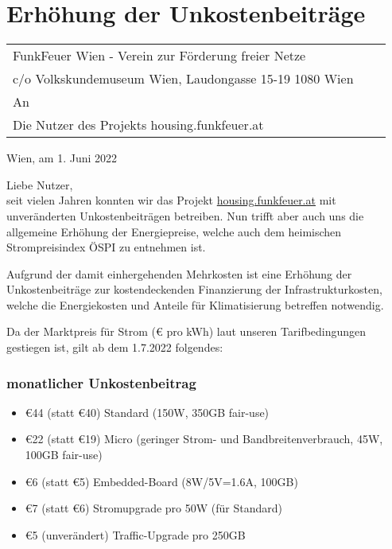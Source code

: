 \documentclass[parskip=half]{scrreprt}
\begin{document}
\vspace{4cm}
\chapter*{Erhöhung der Unkostenbeiträge}
\thispagestyle{fancy}

\begin{tabular}{p{8cm}p{}l}
	
	\vspace{1cm}
	
	{\scriptsize FunkFeuer Wien - Verein zur Förderung freier Netze}\\
	\vspace{-1em}
	{\scriptsize c/o Volkskundemuseum Wien, Laudongasse 15-19 1080 Wien}\\
	An\\ 
	Die Nutzer des Projekts housing.funkfeuer.at
	
\end{tabular}
\begin{flushright}
Wien, am 1. Juni 2022
\end{flushright}
\vspace{0.5cm}

Liebe Nutzer, \\ 

seit vielen Jahren konnten wir das Projekt \href{https://housing.funkfeuer.at}{housing.funkfeuer.at} mit unveränderten Unkostenbeiträgen betreiben. Nun trifft aber auch uns die allgemeine Erhöhung der Energiepreise, welche auch dem heimischen Strompreisindex ÖSPI zu entnehmen ist.

Aufgrund der damit einhergehenden Mehrkosten ist eine Erhöhung der Unkostenbeiträge zur kostendeckenden Finanzierung der Infrastrukturkosten, welche die Energiekosten und Anteile für Klimatisierung betreffen notwendig.

Da der Marktpreis für Strom (€ pro kWh) laut unseren Tarifbedingungen gestiegen ist, gilt ab dem 1.7.2022 folgendes:

\subsection*{monatlicher Unkostenbeitrag}
\begin{itemize}
	\item €44 (statt €40) Standard (150W, 350GB fair-use)
	\item €22 (statt €19) Micro (geringer Strom- und Bandbreitenverbrauch, 45W, 100GB fair-use)
	\item €6  (statt €5) Embedded-Board (8W/5V=1.6A, 100GB)
	\item €7  (statt €6) Stromupgrade pro 50W (für Standard)
	\item €5  (unverändert) Traffic-Upgrade pro 250GB
\end{itemize}
\end{document}
